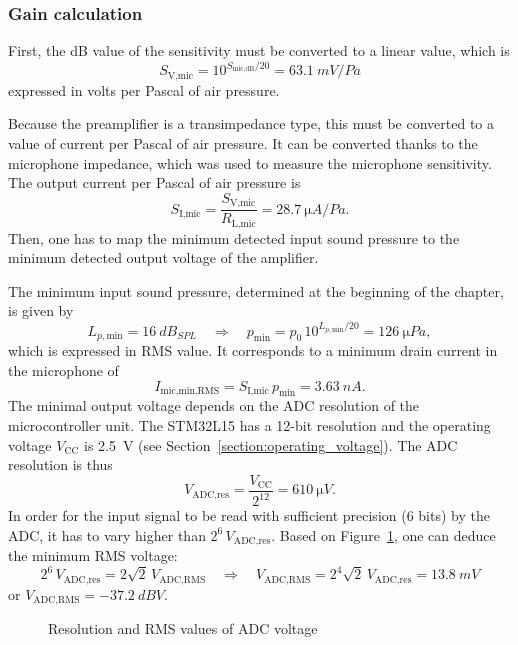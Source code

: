 \documentclass{EPL-master-thesis-covers-EN}
\newcommand{\te}[1]{\textrm{#1}}
\begin{document}
\subsubsection*{Gain calculation}

First, the dB value of the sensitivity must be converted to a linear value, which is
\[
 S_{\te{V,mic}} = 10^{S_{\te{mic,dB}}/20} = \SI{63.1}{mV/Pa}
\]
expressed in volts per Pascal of air pressure.

Because the preamplifier is a transimpedance type, this must be converted to a value of current per Pascal of air pressure. It can be converted thanks to the microphone impedance, which was used to measure the microphone sensitivity. The output current per Pascal of air pressure is
\[
 S_{\te{I,mic}} = \frac{S_{\te{V,mic}}}{R_{\te{L,mic}}} = \SI{28.7}{\micro A/Pa}.
\]
Then, one has to map the minimum detected input sound pressure to the minimum detected output voltage of the amplifier.

The minimum input sound pressure, determined at the beginning of the chapter, is given by
\[
 L_{p,\te{min}} = \SI{16}{dB_{SPL}} \quad \Rightarrow \quad p_\te{min} = p_0 \, 10^{L_{p,\te{min}}/20} = \SI{126}{\micro Pa},
\]
which is expressed in RMS value. It corresponds to a minimum drain current in the microphone of 
\[
 I_{\te{mic,min,RMS}} = S_{\te{I,mic}} \, p_\te{min} = \SI{3.63}{nA}.
\]
The minimal output voltage depends on the ADC resolution of the microcontroller unit. The STM32L15 has a 12-bit resolution and the operating voltage $V_\te{CC}$ is \SI{2.5}{V} (see Section~\ref{section:operating_voltage}). The ADC resolution is thus
\[
 V_{\te{ADC,res}} = \frac{V_\te{CC}}{2^{12}} = \SI{610}{\micro V}.
\]
In order for the input signal to be read with sufficient precision (6 bits) by the ADC, it has to vary higher than $2^6 \,V_{\te{ADC,res}}$. Based on Figure~\ref{fig:ADC_res}, one can deduce the minimum RMS voltage:
\[
 2^6 \, V_{\te{ADC,res}} = 2 \sqrt{2} \, V_\te{ADC,RMS} \quad \Rightarrow \quad V_\te{ADC,RMS} = 2^4 \sqrt{2} \, V_{\te{ADC,res}} = \SI{13.8}{mV}
\]
or $V_{\te{ADC,RMS}} = \SI{-37.2}{dBV}$.

\begin{figure}[H]
\centering
{}
\caption{Resolution and RMS values of ADC voltage}
\label{fig:ADC_res}
\end{figure}
\end{document}
